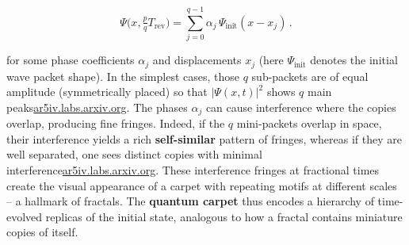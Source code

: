 \documentclass[11pt,a4paper]{article}
\begin{document}
\begin{equation}
\Psi\Big(x,\tfrac{p}{q}T_{\text{rev}}\Big) = \sum_{j=0}^{q-1} \alpha_j\, \Psi_{\text{init}}(x - x_j)\,. \tag{3}
\end{equation}

for some phase coefficients $\alpha_j$ and displacements $x_j$ (here $\Psi_{\text{init}}$ denotes the initial wave packet shape). In the simplest cases, those $q$ sub-packets are of equal amplitude (symmetrically placed) so that $|\Psi(x,t)|^2$ shows $q$ main peaks\href{https://ar5iv.labs.arxiv.org/html/1808.09708#:~:text=Apart from the full revival,shall see%2C the wave function}{ar5iv.labs.arxiv.org}. The phases $\alpha_j$ can cause interference where the copies overlap, producing fine fringes. Indeed, if the $q$ mini-packets overlap in space, their interference yields a rich \textbf{self-similar} pattern of fringes, whereas if they are well separated, one sees distinct copies with minimal interference\href{https://ar5iv.labs.arxiv.org/html/1808.09708#:~:text=where is absolute phase and,separated by in coordinate}{ar5iv.labs.arxiv.org}. These interference fringes at fractional times create the visual appearance of a carpet with repeating motifs at different scales – a hallmark of fractals. The \textbf{quantum carpet} thus encodes a hierarchy of time-evolved replicas of the initial state, analogous to how a fractal contains miniature copies of itself.
\end{document}
